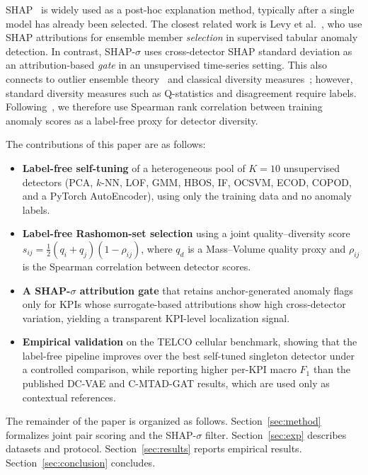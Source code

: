 \documentclass[conference]{IEEEtran}
\begin{document}
SHAP~\cite{Lundberg2017,Lundberg2020} is widely used as a post-hoc
explanation method, typically after a single model has already been
selected. The closest related work is Levy et al.~\cite{Levy2026}, who
use SHAP attributions for ensemble member \emph{selection} in supervised
tabular anomaly detection. In contrast, SHAP-$\sigma$ uses
cross-detector SHAP standard deviation as an attribution-based
\emph{gate} in an unsupervised time-series setting. This also connects
to outlier ensemble theory~\cite{AggarwalSathe2017,Zimek2014} and
classical diversity measures~\cite{Kuncheva2003}; however, standard
diversity measures such as Q-statistics and disagreement require labels.
Following~\cite{Zimek2014}, we therefore use Spearman rank correlation
between training anomaly scores as a label-free proxy for detector
diversity.

The contributions of this paper are as follows:
\begin{itemize}
    \item \textbf{Label-free self-tuning} of 
    a heterogeneous pool of $K{=}10$ unsupervised detectors (PCA, $k$-NN, LOF, GMM, HBOS, IF, OCSVM, ECOD, COPOD, and a PyTorch AutoEncoder), using only the training data and no anomaly labels.
    \item \textbf{Label-free Rashomon-set selection} using a joint quality--diversity score $s_{ij}=\tfrac{1}{2}(q_i+q_j)(1-\rho_{ij})$, where $q_d$ is a Mass--Volume quality proxy and $\rho_{ij}$ is the Spearman correlation between detector scores.
    \item \textbf{A SHAP-$\sigma$ attribution gate} that retains anchor-generated anomaly flags only for KPIs whose surrogate-based attributions show high cross-detector variation, yielding a transparent KPI-level localization signal.
    \item \textbf{Empirical validation} on the TELCO cellular benchmark, showing that the label-free pipeline improves over the best self-tuned singleton detector under a controlled comparison, while reporting higher per-KPI macro $F_1$ than the published DC-VAE and C-MTAD-GAT results, which are used only as contextual references.

\end{itemize}

The remainder of the paper is organized as follows.
Section~\ref{sec:method} formalizes joint pair scoring and the
SHAP-$\sigma$ filter. Section~\ref{sec:exp} describes datasets and
protocol. Section~\ref{sec:results} reports empirical results.
Section~\ref{sec:conclusion} concludes.
\end{document}
